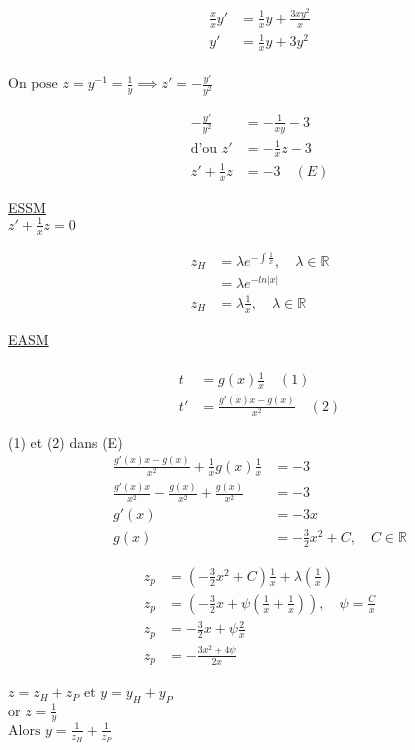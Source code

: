 \begin{align*}
	\frac{x}{x}y' &= \frac{1}{x}y + \frac{3xy^2}{x} \\
	y' &= \frac{1}{x}y + 3y^2 \\
\end{align*}

$\text{On pose } z=y^{-1} = \frac{1}{y} \implies z'= - \frac{y'}{y^2}$

\begin{align*}
	-\frac{y'}{y^2} &= -\frac{1}{xy} - 3 \\
	\text{d'ou } z' &= -\frac{1}{x}z - 3 \\
	z' + \frac{1}{x}z &= -3 \quad (E)
\end{align*}

\underline{ESSM} \\
$z' + \frac{1}{x}z = 0$

\begin{align*}
	z_H &= \lambda e^{-\int \frac{1}{x}}, \quad \lambda \in \mathbb{R} \\
	    &= \lambda e^{-ln|x|} \\
	z_H &= \lambda \frac{1}{x}, \quad \lambda \in \mathbb{R}
\end{align*}

\underline{EASM} \\

 \\
\begin{align*}
	t &= g(x)\frac{1}{x} \quad (1) \\
	t' &= \frac{g'(x)x - g(x)}{x^2} \quad (2)
\end{align*}

(1) et (2) dans (E) \\
\begin{align*}
	\frac{g'(x)x - g(x)}{x^2} + \frac{1}{x} g(x)\frac{1}{x} &= -3 \\
	\frac{g'(x)x}{x^2} - \frac{g(x)}{x^2} + \frac{g(x)}{x^2} &= -3 \\
	g'(x) &= -3x \\
	g(x) &= -\frac{3}{2}x^2 + C, \quad C \in \mathbb{R}
\end{align*}

\begin{align*}
	z_p &= (-\frac{3}{2} x^2 + C) \frac{1}{x} + \lambda(\frac{1}{x}) \\
	z_p &= (-\frac{3}{2}x + \psi(\frac{1}{x} + \frac{1}{x})), \quad \psi = \frac{C}{x} \\
	z_p &= -\frac{3}{2}x + \psi\frac{2}{x} \\
	z_p &= -\frac{3x^2 + 4\psi}{2x} \\
\end{align*}

$z = z_H + z_P \text{ et } y = y_H + y_P$ \\
$\text{or } z = \frac{1}{y} $ \\
$\text{Alors } y = \frac{1}{z_H} + \frac{1}{z_P} $
